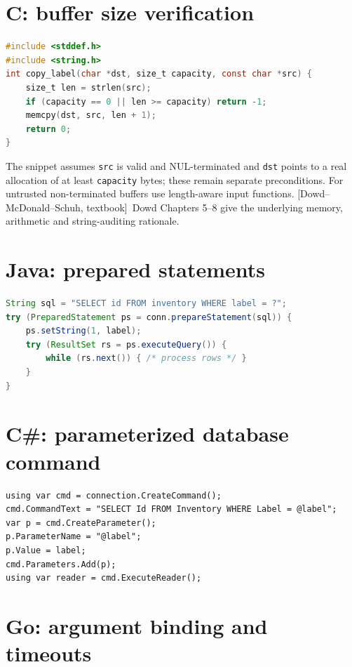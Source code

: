 \documentclass[11pt,letterpaper,oneside]{book}
\newcommand{\srcD}{\textsf{[Dowd--McDonald--Schuh, textbook]}}
\begin{document}
\section{C: buffer size verification}

\begin{lstlisting}[caption={C11: guarded copy with explicit capacity contract},language=C]
#include <stddef.h>
#include <string.h>
int copy_label(char *dst, size_t capacity, const char *src) {
    size_t len = strlen(src);
    if (capacity == 0 || len >= capacity) return -1;
    memcpy(dst, src, len + 1);
    return 0;
}
\end{lstlisting}

The snippet assumes \texttt{src} is valid and NUL-terminated and \texttt{dst} points to a real allocation of at least \texttt{capacity} bytes; these remain separate preconditions. For untrusted non-terminated buffers use length-aware input functions. \srcD\ Dowd Chapters 5--8 give the underlying memory, arithmetic and string-auditing rationale.

\section{Java: prepared statements}

\begin{lstlisting}[caption={Java: JDBC prepared statement (context assumes valid connection)},language=Java]
String sql = "SELECT id FROM inventory WHERE label = ?";
try (PreparedStatement ps = conn.prepareStatement(sql)) {
    ps.setString(1, label);
    try (ResultSet rs = ps.executeQuery()) {
        while (rs.next()) { /* process rows */ }
    }
}
\end{lstlisting}

\section{C\#: parameterized database command}

\begin{lstlisting}[caption={C sharp: parameterized ADO.NET (provider-specific details apply)}]
using var cmd = connection.CreateCommand();
cmd.CommandText = "SELECT Id FROM Inventory WHERE Label = @label";
var p = cmd.CreateParameter();
p.ParameterName = "@label";
p.Value = label;
cmd.Parameters.Add(p);
using var reader = cmd.ExecuteReader();
\end{lstlisting}

\section{Go: argument binding and timeouts}
\end{document}
